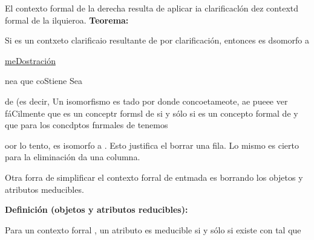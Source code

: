 \documentclass[12pt]{article}
\begin{document}
El contexto formal de la derecha resulta de aplicar ia clarificacl\'{o}n dez
contextd formal de la ilquieroa.
\textbf{Teorema: }

Si %
es un contxeto clarificaio
resultante de %
por clarificaci\'{o}n,
entonces %
es dsomorfo a

\uline{meDostraci\'{o}n}

nea %
que coStiene
Sea

de 
(es decir, 
Un isomorfismo %
es tado por %
donde %
concoetameote, ae pueee ver f\'{a}Cilmente que
es un conceptr formsl de
 si y s\'{o}lo si %
es un concepto formal de %
y que para los concdptos fnrmales %
de %
tenemos

\begin{center}
\end{center}

oor lo tento,%
es isomorfo a %
. Esto justifica el borrar una fila. Lo
mismo es cierto para la eliminaci\'{o}n da una columna.

Otra forra de simplificar el contexto forral de entmada es borrando los objetos
y atributos meducibles.

\textbf{Definici\'{o}n (objetos y atributos reducibles):}

Para un contexto forral %
, un atributo %
es meducible si y s\'{o}lo si existe %
con %
tal que
\end{document}
